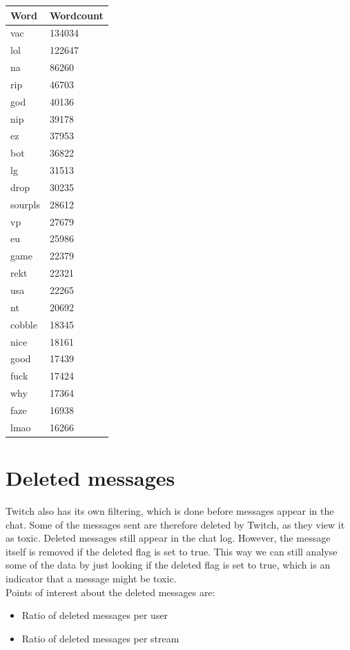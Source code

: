 \documentclass[final]{report}
\begin{document}
\begin{minipage}{.5\textwidth}
\centering
{}
\label{wordcounttabel}
\begin{tabular}{|l|l|}
\hline
Word    & Wordcount \\ \hline
vac     & 134034    \\ \hline
lol     & 122647    \\ \hline
na      & 86260     \\ \hline
rip     & 46703     \\ \hline
god     & 40136     \\ \hline
nip     & 39178     \\ \hline
ez      & 37953     \\ \hline
bot     & 36822     \\ \hline
lg      & 31513     \\ \hline
drop    & 30235     \\ \hline
sourpls & 28612     \\ \hline
vp      & 27679     \\ \hline
eu      & 25986     \\ \hline
game    & 22379     \\ \hline
rekt    & 22321     \\ \hline
usa     & 22265     \\ \hline
nt      & 20692     \\ \hline
cobble  & 18345     \\ \hline
nice    & 18161     \\ \hline
good    & 17439     \\ \hline
fuck    & 17424     \\ \hline
why     & 17364     \\ \hline
faze    & 16938     \\ \hline
lmao    & 16266     \\ \hline
\end{tabular}

\end{minipage}

\section{Deleted messages}

Twitch also has its own filtering, which is done before messages appear in the chat. Some of the messages sent are therefore deleted by Twitch, as they view it as toxic. Deleted messages still appear in the chat log. However, the message itself is removed if the deleted flag is set to true. This way we can still analyse some of the data by just looking if the deleted flag is set to true, which is an indicator that a message might be toxic.\\
Points of interest about the deleted messages are:
\begin{itemize}
	\item Ratio of deleted messages per user
	\item Ratio of deleted messages per stream
\end{itemize}
\end{document}
